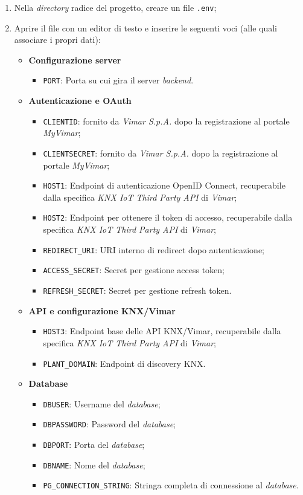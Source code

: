 \documentclass[10pt, letterpaper]{article}
\begin{document}
\begin{enumerate}
    \item Nella \textit{directory} radice del progetto, creare un file \texttt{.env};
    \item Aprire il file con un editor di testo e inserire le seguenti voci (alle quali associare i propri dati):
\begin{itemize}
    \item \textbf{Configurazione server}
    \begin{itemize}
        \item \texttt{PORT}: Porta su cui gira il server \textit{backend}.
    \end{itemize}

    \item \textbf{Autenticazione e OAuth}
    \begin{itemize}
        \item \texttt{CLIENTID}: fornito da \textit{Vimar S.p.A.} dopo la registrazione al portale \textit{MyVimar};
        \item \texttt{CLIENTSECRET}: fornito da \textit{Vimar S.p.A.} dopo la registrazione al portale \textit{MyVimar};
        \item \texttt{HOST1}: Endpoint di autenticazione OpenID Connect, recuperabile dalla specifica \textit{KNX IoT Third Party API} di \textit{Vimar};
        \item \texttt{HOST2}: Endpoint per ottenere il token di accesso, recuperabile dalla specifica \textit{KNX IoT Third Party API} di \textit{Vimar};
        \item \texttt{REDIRECT\_URI}: URI interno di redirect dopo autenticazione;
        \item \texttt{ACCESS\_SECRET}: Secret per gestione access token;
        \item \texttt{REFRESH\_SECRET}: Secret per gestione refresh token.
    \end{itemize}

    \item \textbf{API e configurazione KNX/Vimar}
    \begin{itemize}
        \item \texttt{HOST3}: Endpoint base delle API KNX/Vimar, recuperabile dalla specifica \textit{KNX IoT Third Party API} di \textit{Vimar};
        \item \texttt{PLANT\_DOMAIN}: Endpoint di discovery KNX.
    \end{itemize}

    \item \textbf{Database}
    \begin{itemize}
        \item \texttt{DBUSER}: Username del \textit{database};
        \item \texttt{DBPASSWORD}: Password del \textit{database};
        \item \texttt{DBPORT}: Porta del \textit{database};
        \item \texttt{DBNAME}: Nome del \textit{database};
        \item \texttt{PG\_CONNECTION\_STRING}: Stringa completa di connessione al \textit{database}.
    \end{itemize}


\end{itemize}
\end{enumerate}
\end{document}
